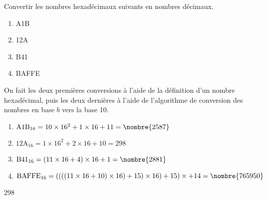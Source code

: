 \begin{exercice}
  Convertir les nombres hexadécimaux suivants en nombres décimaux.
  \begin{enumerate}
  \item A1B
  \item 12A
  \item B41
  \item BAFFE
  \end{enumerate}
  \begin{sol}
    On fait les deux premières conversions à l'aide de la définition
    d'un nombre hexadécimal, puis les deux dernières à l'aide de
    l'algorithme de conversion des nombres en base $b$ vers la base
    10.
    \begin{enumerate}
    \item $\text{A1B}_{16} = 10 \times 16^2 + 1 \times 16 + 11 = \nombre{2587}$
    \item $\text{12A}_{16} = 1 \times 16^2 + 2 \times 16 + 10 = 298$
    \item $\text{B41}_{16} = (11 \times 16 + 4) \times 16 + 1 = \nombre{2881}$
    \item $\text{BAFFE}_{16} = ((((11 \times 16 + 10) \times 16) + 15)
      \times 16) + 15) \times  + 14 = \nombre{765950}$
    \end{enumerate}
  \end{sol}
  \begin{rep}
    \begin{inparaenum}
    \item {}
    \item 298
    \item {}
    \item {}
    \end{inparaenum}
  \end{rep}
\end{exercice}

